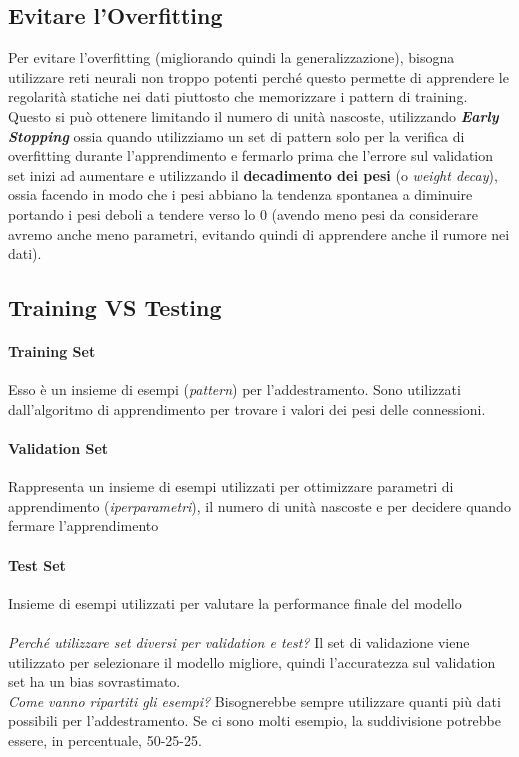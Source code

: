 \subsection{Evitare l'Overfitting}
Per evitare l'overfitting (migliorando quindi la generalizzazione), bisogna utilizzare reti neurali non troppo potenti perché questo permette di apprendere le regolarità statiche nei dati piuttosto che memorizzare i pattern di training. Questo si può ottenere limitando il numero di unità nascoste,
utilizzando \textbf{\textit{Early Stopping}} ossia quando utilizziamo un set di pattern solo per la verifica di overfitting durante l'apprendimento e fermarlo prima che l'errore sul validation set inizi ad aumentare e utilizzando il \textbf{decadimento dei pesi} (o \textit{weight decay}), ossia facendo in modo che i pesi abbiano la tendenza spontanea a diminuire portando i pesi deboli a tendere verso lo 0 (avendo meno pesi da considerare avremo anche meno parametri, evitando quindi di apprendere anche il rumore nei dati).

\subsection{Training VS Testing}
\paragraph{Training Set}
Esso è un insieme di esempi (\textit{pattern}) per l'addestramento. Sono utilizzati dall'algoritmo di apprendimento per trovare i valori dei pesi delle connessioni.

\paragraph{Validation Set}
Rappresenta un insieme di esempi utilizzati per ottimizzare parametri di apprendimento (\textit{iperparametri}), il numero di unità nascoste e per decidere quando fermare l'apprendimento

\paragraph{Test Set}
Insieme di esempi utilizzati per valutare la performance finale del modello\\
\\
\textit{Perché utilizzare set diversi per validation e test?} Il set di validazione viene utilizzato per selezionare il modello migliore, quindi l'accuratezza sul validation set ha un bias sovrastimato.\\
\textit{Come vanno ripartiti gli esempi?} Bisognerebbe sempre utilizzare quanti più dati possibili per l'addestramento. Se ci sono molti esempio, la suddivisione potrebbe essere, in percentuale, 50-25-25.

